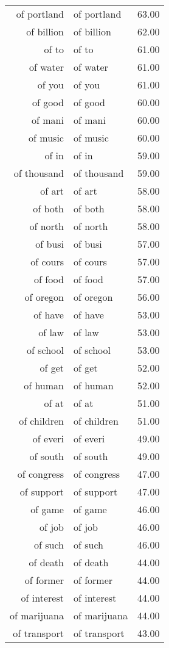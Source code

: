\begin{table}[ht]
\begin{tabular}{rlr}
  of portland & of portland & 63.00 \\ 
  of billion & of billion & 62.00 \\ 
  of to & of to & 61.00 \\ 
  of water & of water & 61.00 \\ 
  of you & of you & 61.00 \\ 
  of good & of good & 60.00 \\ 
  of mani & of mani & 60.00 \\ 
  of music & of music & 60.00 \\ 
  of in & of in & 59.00 \\ 
  of thousand & of thousand & 59.00 \\ 
  of art & of art & 58.00 \\ 
  of both & of both & 58.00 \\ 
  of north & of north & 58.00 \\ 
  of busi & of busi & 57.00 \\ 
  of cours & of cours & 57.00 \\ 
  of food & of food & 57.00 \\ 
  of oregon & of oregon & 56.00 \\ 
  of have & of have & 53.00 \\ 
  of law & of law & 53.00 \\ 
  of school & of school & 53.00 \\ 
  of get & of get & 52.00 \\ 
  of human & of human & 52.00 \\ 
  of at & of at & 51.00 \\ 
  of children & of children & 51.00 \\ 
  of everi & of everi & 49.00 \\ 
  of south & of south & 49.00 \\ 
  of congress & of congress & 47.00 \\ 
  of support & of support & 47.00 \\ 
  of game & of game & 46.00 \\ 
  of job & of job & 46.00 \\ 
  of such & of such & 46.00 \\ 
  of death & of death & 44.00 \\ 
  of former & of former & 44.00 \\ 
  of interest & of interest & 44.00 \\ 
  of marijuana & of marijuana & 44.00 \\ 
  of transport & of transport & 43.00 \\ 

\end{tabular}
\end{table}
